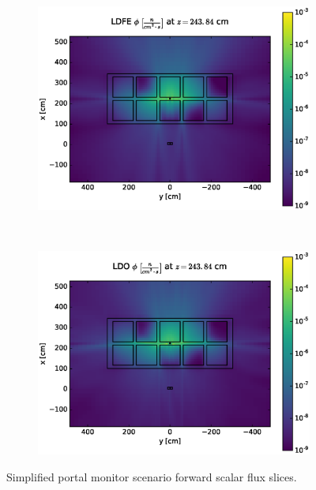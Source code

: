 \documentclass{article} %
\begin{document}
\begin{figure}[!htb]
\ContinuedFloat
\begin{subfigure}{\textwidth}
\centering
\includegraphics[max height=0.445\textheight]
{img/portal-fwd-flux-ldfe01.eps}
\end{subfigure}
\\
\begin{subfigure}{\textwidth}
\centering
\includegraphics[max height=0.445\textheight]
{img/portal-fwd-flux-ldo11.eps}
\end{subfigure}
\caption{Simplified portal monitor scenario forward scalar flux slices.}
\label{cargo-fwd-slices}
\end{figure}
\end{document}
